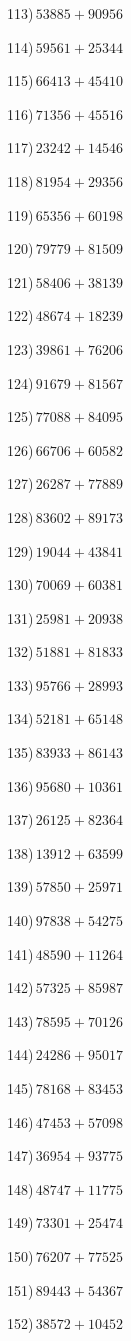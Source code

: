 \documentclass{article}
\begin{document}
\begin{multicols}{2}
113)$\,53885+90956$ \par 
114)$\,59561+25344$ \par 
115)$\,66413+45410$ \par 
116)$\,71356+45516$ \par 
117)$\,23242+14546$ \par 
118)$\,81954+29356$ \par 
119)$\,65356+60198$ \par 
120)$\,79779+81509$ \par 
121)$\,58406+38139$ \par 
122)$\,48674+18239$ \par 
123)$\,39861+76206$ \par 
124)$\,91679+81567$ \par 
125)$\,77088+84095$ \par 
126)$\,66706+60582$ \par 
127)$\,26287+77889$ \par 
128)$\,83602+89173$ \par 
129)$\,19044+43841$ \par 
130)$\,70069+60381$ \par 
131)$\,25981+20938$ \par 
132)$\,51881+81833$ \par 
133)$\,95766+28993$ \par 
134)$\,52181+65148$ \par 
135)$\,83933+86143$ \par 
136)$\,95680+10361$ \par 
137)$\,26125+82364$ \par 
138)$\,13912+63599$ \par 
139)$\,57850+25971$ \par 
140)$\,97838+54275$ \par 
141)$\,48590+11264$ \par 
142)$\,57325+85987$ \par 
143)$\,78595+70126$ \par 
144)$\,24286+95017$ \par 
145)$\,78168+83453$ \par 
146)$\,47453+57098$ \par 
147)$\,36954+93775$ \par 
148)$\,48747+11775$ \par 
149)$\,73301+25474$ \par 
150)$\,76207+77525$ \par 
151)$\,89443+54367$ \par 
152)$\,38572+10452$ \par 

\end{multicols}
\end{document}
